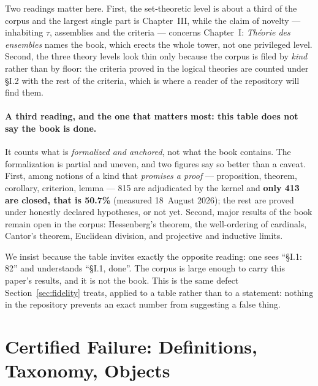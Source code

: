 \documentclass[11pt]{article}
\theoremstyle{remark}\newtheorem{example}{Example}
\begin{document}
Two readings matter here. First, the set-theoretic level is about a third of the
corpus and the largest single part is Chapter~III, while the claim of novelty ---
inhabiting $\tau$, assemblies and the criteria --- concerns Chapter~I:
\emph{Th\'eorie des ensembles} names the book, which erects the whole tower, not one
privileged level. Second, the three theory levels look thin only because the corpus is
filed by \emph{kind} rather than by floor: the criteria proved in the logical theories
are counted under \S I.2 with the rest of the criteria, which is where a reader of the
repository will find them.

\paragraph{A third reading, and the one that matters most: this table does not say the
book is done.} It counts what is \emph{formalized and anchored}, not what the book
contains. The formalization is partial and uneven, and two figures say so better than a
caveat. First, among notions of a kind that \emph{promises a proof} --- proposition,
theorem, corollary, criterion, lemma --- 815 are adjudicated by the kernel and
\textbf{only 413 are closed, that is 50.7\%} (measured 18~August 2026); the rest are
proved under honestly declared hypotheses, or not yet. Second, major results of the book
remain open in the corpus: Hessenberg's theorem, the well-ordering of cardinals,
Cantor's theorem, Euclidean division, and projective and inductive limits.

We insist because the table invites exactly the opposite reading: one sees ``\S I.1: 82''
and understands ``\S I.1, done''. The corpus is large enough to carry this paper's
results, and it is not the book. This is the same defect Section~\ref{sec:fidelity}
treats, applied to a table rather than to a statement: nothing in the repository prevents
an exact number from suggesting a false thing.


\section{Certified Failure: Definitions, Taxonomy, Objects}
\label{sec:certified-failure}
\end{document}
